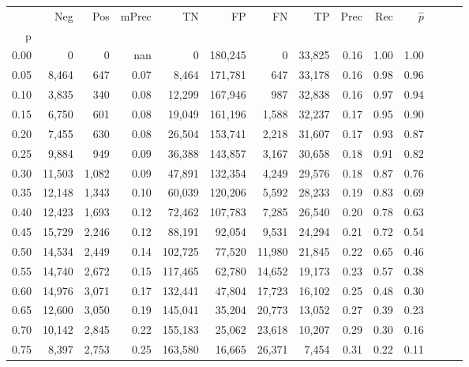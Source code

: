 \begin{tabular}{rrrrrrrrrrrrrr}
\toprule
{} &     Neg &    Pos & mPrec &       TN &       FP &      FN &      TP &  Prec &   Rec & $\hat{p}$ \\
p    &         &        &       &          &          &         &         &       &       &           \\
\midrule
0.00 &       0 &      0 &   nan &        0 &  180,245 &       0 &  33,825 &  0.16 &  1.00 &      1.00 \\
0.05 &   8,464 &    647 &  0.07 &    8,464 &  171,781 &     647 &  33,178 &  0.16 &  0.98 &      0.96 \\
0.10 &   3,835 &    340 &  0.08 &   12,299 &  167,946 &     987 &  32,838 &  0.16 &  0.97 &      0.94 \\
0.15 &   6,750 &    601 &  0.08 &   19,049 &  161,196 &   1,588 &  32,237 &  0.17 &  0.95 &      0.90 \\
0.20 &   7,455 &    630 &  0.08 &   26,504 &  153,741 &   2,218 &  31,607 &  0.17 &  0.93 &      0.87 \\
0.25 &   9,884 &    949 &  0.09 &   36,388 &  143,857 &   3,167 &  30,658 &  0.18 &  0.91 &      0.82 \\
0.30 &  11,503 &  1,082 &  0.09 &   47,891 &  132,354 &   4,249 &  29,576 &  0.18 &  0.87 &      0.76 \\
0.35 &  12,148 &  1,343 &  0.10 &   60,039 &  120,206 &   5,592 &  28,233 &  0.19 &  0.83 &      0.69 \\
0.40 &  12,423 &  1,693 &  0.12 &   72,462 &  107,783 &   7,285 &  26,540 &  0.20 &  0.78 &      0.63 \\
0.45 &  15,729 &  2,246 &  0.12 &   88,191 &   92,054 &   9,531 &  24,294 &  0.21 &  0.72 &      0.54 \\
0.50 &  14,534 &  2,449 &  0.14 &  102,725 &   77,520 &  11,980 &  21,845 &  0.22 &  0.65 &      0.46 \\
0.55 &  14,740 &  2,672 &  0.15 &  117,465 &   62,780 &  14,652 &  19,173 &  0.23 &  0.57 &      0.38 \\
0.60 &  14,976 &  3,071 &  0.17 &  132,441 &   47,804 &  17,723 &  16,102 &  0.25 &  0.48 &      0.30 \\
0.65 &  12,600 &  3,050 &  0.19 &  145,041 &   35,204 &  20,773 &  13,052 &  0.27 &  0.39 &      0.23 \\
0.70 &  10,142 &  2,845 &  0.22 &  155,183 &   25,062 &  23,618 &  10,207 &  0.29 &  0.30 &      0.16 \\
0.75 &   8,397 &  2,753 &  0.25 &  163,580 &   16,665 &  26,371 &   7,454 &  0.31 &  0.22 &      0.11 \\

\end{tabular}
